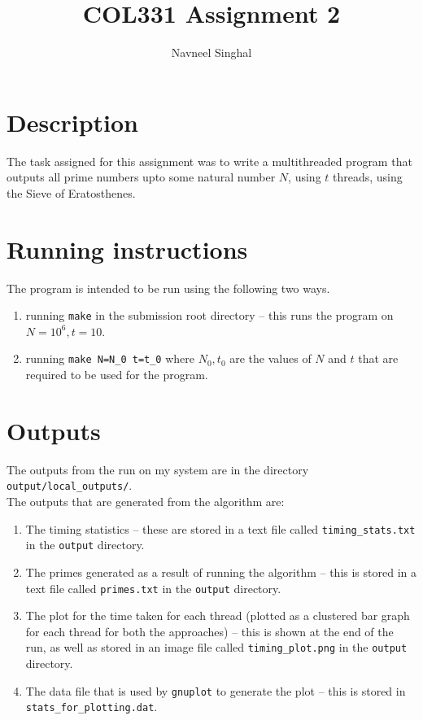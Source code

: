 \documentclass[a4paper]{article}
\title{\textbf{COL331 Assignment 2}}
\author{Navneel Singhal}
\date{}
\newcommand{\nl}{\vspace{0.2cm}\\}
\begin{document}
\maketitle
\tableofcontents

\section{Description}

The task assigned for this assignment was to write a multithreaded program that outputs all prime numbers upto some natural number $N$, using $t$ threads, using the Sieve of Eratosthenes.

\section{Running instructions}

The program is intended to be run using the following two ways.

\begin{enumerate}
    \item running \texttt{make} in the submission root directory -- this runs the program on $N = 10^6, t = 10$.
    \item running \texttt{make N=N\_0 t=t\_0} where $N_0, t_0$ are the values of $N$ and $t$ that are required to be used for the program.
\end{enumerate}

\section{Outputs}

The outputs from the run on my system are in the directory \texttt{output/local\_outputs/}.\nl
The outputs that are generated from the algorithm are:

\begin{enumerate}
    \item The timing statistics -- these are stored in a text file called \texttt{timing\_stats.txt} in the \texttt{output} directory.
    \item The primes generated as a result of running the algorithm -- this is stored in a text file called \texttt{primes.txt} in the \texttt{output} directory.
    \item The plot for the time taken for each thread (plotted as a clustered bar graph for each thread for both the approaches) -- this is shown at the end of the run, as well as stored in an
        image file called \texttt{timing\_plot.png} in the \texttt{output} directory. 
    \item The data file that is used by \texttt{gnuplot} to generate the plot -- this is stored in \texttt{stats\_for\_plotting.dat}.
\end{enumerate}
\end{document}
